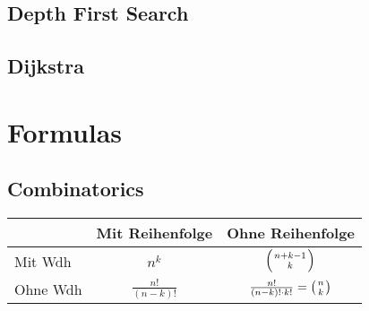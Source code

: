\documentclass[11pt]{article}
\begin{document}
\subsection{Depth First Search}


\subsection{Dijkstra}



\section{Formulas}

\subsection{Combinatorics}
\begin{tabular}{ | l | c | c |}
  \hline
   & Mit Reihenfolge & Ohne Reihenfolge \\ \hline
   Mit Wdh & $n^k$ & $\left( {n+k-1} \atop k \right)$  \\ \hline
   Ohne Wdh & $\frac{n!}{\left( n-k \right) !}$ & $\frac{n!}{\left( n-k \right) !\cdot k!} = \left( n \atop k \right)$  \\ \hline
\end{tabular}
\end{document}
